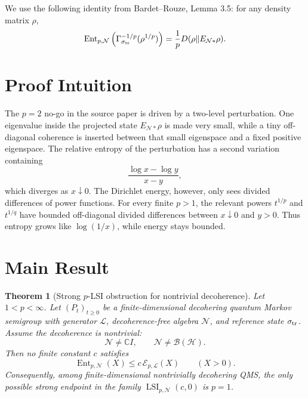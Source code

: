 \documentclass[11pt]{article}
\newtheorem{theorem}{Theorem}
\newcommand{\B}{\mathcal B}
\newcommand{\cE}{\mathcal E}
\newcommand{\cH}{\mathcal H}
\newcommand{\cL}{\mathcal L}
\newcommand{\cN}{\mathcal N}
\newcommand{\Ent}{\operatorname{Ent}}
\newcommand{\LSI}{\operatorname{LSI}}
\newcommand{\Gammaop}{\Gamma_{\sigma_{\rm tr}}}
\begin{document}
We use the following identity from Bardet--Rouze, Lemma 3.5: for any density matrix \(\rho\),
\[
  \Ent_{p,\cN}\left(\Gammaop^{-1/p}(\rho^{1/p})\right)
  =
  \frac{1}{p}D(\rho\|E_{\cN *}\rho).
\]

\section*{Proof Intuition}

The \(p=2\) no-go in the source paper is driven by a two-level perturbation. One eigenvalue inside the projected state \(E_{\cN *}\rho\) is made very small, while a tiny off-diagonal coherence is inserted between that small eigenspace and a fixed positive eigenspace. The relative entropy of the perturbation has a second variation containing
\[
  \frac{\log x-\log y}{x-y},
\]
which diverges as \(x\downarrow0\). The Dirichlet energy, however, only sees divided differences of power functions. For every finite \(p>1\), the relevant powers \(t^{1/p}\) and \(t^{1/q}\) have bounded off-diagonal divided differences between \(x\downarrow0\) and \(y>0\). Thus entropy grows like \(\log(1/x)\), while energy stays bounded.

\section*{Main Result}

\begin{theorem}[Strong \(p\)-LSI obstruction for nontrivial decoherence]
Let \(1<p<\infty\). Let \((P_t)_{t\ge0}\) be a finite-dimensional decohering quantum Markov semigroup with generator \(\cL\), decoherence-free algebra \(\cN\), and reference state \(\sigma_{\rm tr}\). Assume the decoherence is nontrivial:
\[
  \cN\ne \mathbb C I,\qquad \cN\ne \B(\cH).
\]
Then no finite constant \(c\) satisfies
\[
  \Ent_{p,\cN}(X)\le c\,\cE_{p,\cL}(X)\qquad(X>0).
\]
Consequently, among finite-dimensional nontrivially decohering QMS, the only possible strong endpoint in the family \(\LSI_{p,\cN}(c,0)\) is \(p=1\).
\end{theorem}
\end{document}
